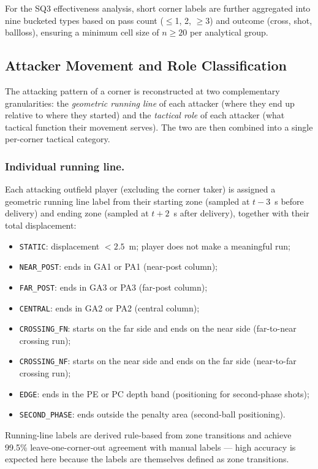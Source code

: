 For the SQ3 effectiveness analysis, short corner labels are further aggregated
into nine bucketed types based on pass count ($\leq$1, 2, $\geq$3) and outcome
(cross, shot, ballloss), ensuring a minimum cell size of $n \geq 20$
per analytical group.

\subsection{Attacker Movement and Role Classification}
\label{sec:sq2_runs}

The attacking pattern of a corner is reconstructed at two complementary
granularities: the \emph{geometric running line} of each attacker (where they
end up relative to where they started) and the \emph{tactical role} of each
attacker (what tactical function their movement serves). The two are then
combined into a single per-corner tactical category.

\subsubsection{Individual running line.}
Each attacking outfield player (excluding the corner taker) is assigned a
geometric running line label from their starting zone (sampled at $t-3$~s
before delivery) and ending zone (sampled at $t+2$~s after delivery), together
with their total displacement:

\begin{itemize}
  \item \texttt{STATIC}: displacement $< 2.5$~m; player does not make a
        meaningful run;
  \item \texttt{NEAR\_POST}: ends in GA1 or PA1 (near-post column);
  \item \texttt{FAR\_POST}: ends in GA3 or PA3 (far-post column);
  \item \texttt{CENTRAL}: ends in GA2 or PA2 (central column);
  \item \texttt{CROSSING\_FN}: starts on the far side and ends on the near
        side (far-to-near crossing run);
  \item \texttt{CROSSING\_NF}: starts on the near side and ends on the far
        side (near-to-far crossing run);
  \item \texttt{EDGE}: ends in the PE or PC depth band (positioning for
        second-phase shots);
  \item \texttt{SECOND\_PHASE}: ends outside the penalty area (second-ball
        positioning).
\end{itemize}
Running-line labels are derived rule-based from zone transitions and achieve
99.5\% leave-one-corner-out agreement with manual labels — high accuracy is
expected here because the labels are themselves defined as zone transitions.

